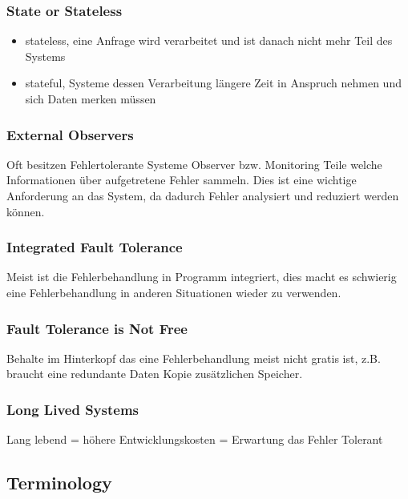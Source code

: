 \subsubsection*{State or Stateless}

\begin{itemize}
	\item stateless, eine Anfrage wird verarbeitet und ist danach nicht mehr Teil des Systems
	\item stateful, Systeme dessen Verarbeitung längere Zeit in Anspruch nehmen und sich Daten merken müssen
\end{itemize}

\subsubsection*{External Observers}

Oft besitzen Fehlertolerante Systeme Observer bzw. Monitoring Teile welche Informationen über aufgetretene Fehler sammeln. Dies ist eine wichtige Anforderung an das System, da dadurch Fehler analysiert und reduziert werden können.

\subsubsection*{Integrated Fault Tolerance}

Meist ist die Fehlerbehandlung in Programm integriert, dies macht es schwierig eine Fehlerbehandlung in anderen Situationen wieder zu verwenden.

\subsubsection*{Fault Tolerance is Not Free}

Behalte im Hinterkopf das eine Fehlerbehandlung meist nicht gratis ist, z.B. braucht eine redundante Daten Kopie zusätzlichen Speicher.

\subsubsection*{Long Lived Systems}

Lang lebend = höhere Entwicklungskosten = Erwartung das Fehler Tolerant

\subsection{Terminology}

